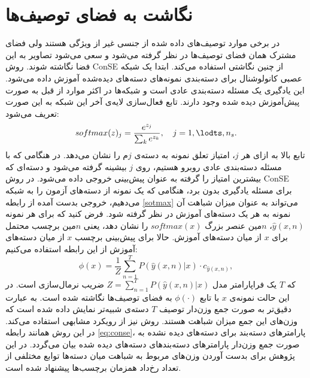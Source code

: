 \section{نگاشت به فضای توصیف‌ها}
در برخی موارد توصیف‌های داده شده از جنسی غیر از ویژگی هستند ولی فضای مشترک همان فضای توصیف‌ها در نظر گرفته می‌شود و سعی می‌شود تصاویر به این فضا نگاشته شوند.
روش ConSE
 \cite{convec} 
از چنین نگاشتی استفاده می‌کند.  ابتدا یک شبکه عصبی کانولوشنال برای دسته‌بندی نمونه‌های دسته‌های دیده‌شده آموزش داده می‌شود. این یادگیری یک مسئله دسته‌بندی عادی است و شبکه‌ها در اکثر موارد از قبل به صورت پیش‌آموزش دیده شده وجود دارند. تابع فعال‌سازی 
  لایه‌ی آخر این شبکه  به این صورت تعریف می‌شود:
 \begin{equation}
 \label{softmax}
 softmax(z)_j = \frac{e^{z_j}}{\sum_k e^{z_k}}, \quad j = 1, \lodts, n_s.
 \end{equation} 
 تابع بالا به ازای هر $j$، امتیاز تعلق نمونه به دسته‌ی $j$م را نشان می‌دهد. در هنگامی که با مسئله دسته‌بندی عادی روبرو هستیم، روی $j$ بیشینه گرفته می‌شود و دسته‌ای که بیشترین امتیاز را گرفته به عنوان پیش‌بینی خروجی داده می‌شود. در روش ConSE برای مسئله یادگیری بدون برد، هنگامی که یک نمونه از دسته‌های آزمون را به شبکه می‌دهیم، خروجی بدست آمده از رابطه \eqref{sotmax} می‌تواند به عنوان میزان شباهت آن نمونه به هر یک دسته‌های آموزش در نظر گرفته شود. 
  فرض کنید که برای هر نمونه
 $\hat{y}(x,n)$،
 $n$مین 
 عنصر بزرگ $softmax(x)$ را نشان دهد، یعنی $n$مین برچسب محتمل برای $x$ از میان دسته‌های آموزش. حالا برای پیش‌بینی برچسب $x$ از میان دسته‌های آموزش از این رابطه استفاده می‌کنیم:
 \begin{equation}
 \label{eq:conse}
 \phi(x) = \frac{1}{Z} \sum_{n=1}^T P(\hat{y}(x,n) | x) \cdot c_{\hat{y}(x,n)},
 \end{equation}
 که $T$ یک فراپارامتر مدل
 $Z = \sum_{n=1}^T P(\hat{y}(x,n) | x) $
 ضریب نرمال‌سازی است. در این حالت نمونه‌ی $x$ با تابع $\phi(\cdot)$ به فضای توصیف‌ها نگاشته شده است. به عبارت دقیق‌تر به صورت جمع وزن‌دار توصیف $T$ دسته‌ی شبیه‌تر نمایش داده شده است که وزن‌های این جمع میزان شباهت هستند. 
 روش 
 \cite{costa}
 نیز از رویکرد مشابهی استفاده می‌کند. در این روش همانند رابطه \eqref{eq:conse}، پارامترهای دسته‌بند برای دسته‌های دیده نشده به صورت جمع وزن‌دار پارامترهای دسته‌بندهای دسته‌های دیده شده بیان می‌گردد. در این پژوهش برای بدست آوردن وزن‌های مربوط به شباهت میان دسته‌ها توابع مختلفی از تعداد رخ‌داد همزمان برچسب‌ها پیشنهاد شده است.


